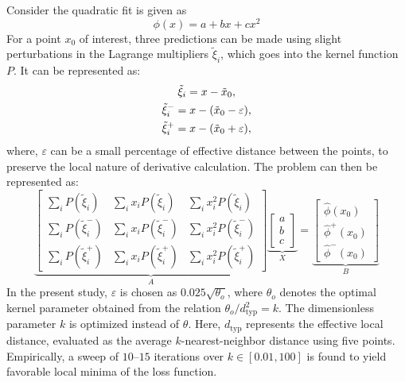 \documentclass{article} %
\theoremstyle{plain}
\begin{document}
Consider the quadratic fit is given as
\begin{equation}
\phi(x) = a + bx +cx^2
\end{equation}
For a point $x_0$ of interest, three predictions can be made using slight perturbations in the Lagrange multipliers $\tilde{\xi}_i$, which goes into the kernel function $P$. It can be represented as:
\begin{gather}
    \tilde{\xi}_i = x - \tilde{x}_0 , \notag \\
    \tilde{\xi}^-_i = x - (\tilde{x}_0 - \varepsilon ), \notag \\
    \tilde{\xi}^+_i = x - (\tilde{x}_0 +\varepsilon ),
\end{gather}
where, $\varepsilon$ can be a small percentage of effective distance between the points, to preserve the local nature of derivative calculation. The problem can then be represented as:
\[
\underbrace{
\begin{bmatrix}
\sum_i P(\tilde{\xi}_i) & \sum_i x_i P({\tilde{\xi}}_i) & \sum_i x^2_i P({\tilde{\xi}}_i) \\
\sum_i P(\tilde{\xi}^-_i) & \sum_i x_i P(\tilde{\xi}^-_i) & \sum_i x_i^2 P(\tilde{\xi}^-_i)\\
\sum_i P(\tilde{\xi}^+_i) & \sum_i x_i P(\tilde{\xi}^+_i) & \sum_i x_i^2 P(\tilde{\xi}^+_i) 
\end{bmatrix}}_{A}
\underbrace{
\begin{bmatrix}
a \\ b \\ c
\end{bmatrix}}_{X}
=
\underbrace{
\begin{bmatrix}
\hat{\phi}(x_0) \\ \hat{\phi}^+(x_0) \\ \hat{\phi}^-(x_0)
\end{bmatrix}}_{B}
\]
In the present study, $\varepsilon$ is chosen as $0.025\sqrt{\theta_o}$, where $\theta_o$ denotes the optimal kernel parameter obtained from the relation $\theta_o/d_{\text{typ}}^2 = k$. The dimensionless parameter $k$ is optimized instead of $\theta$. Here, $d_{\text{typ}}$ represents the effective local distance, evaluated as the average $k$-nearest-neighbor distance using five points. Empirically, a sweep of $10$–$15$ iterations over $k \in [0.01,100]$ is found to yield favorable local minima of the loss function. 
\end{document}
